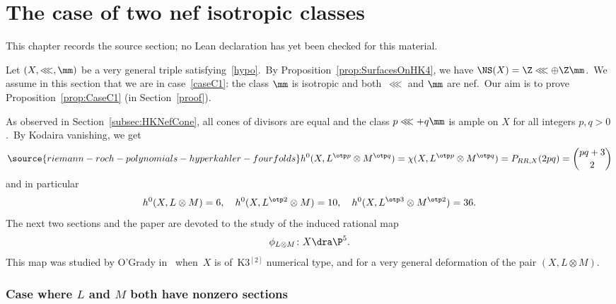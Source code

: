 \chapter{The case of two nef isotropic classes}
\label{riemann-roch-polynomials-hyperkahler-fourfolds-chapter-06}

\begin{remark}
\label{riemann-roch-polynomials-hyperkahler-fourfolds-chapter-06-source}
This chapter records the source section; no Lean declaration has yet been checked for this material.
\notready
\end{remark}

\label{sec:TwoNefIsotropic}

Let $(X,\lll,\mm)$ be a very general triple satisfying~\eqref{hypo}.\
By Proposition~\ref{prop:SurfacesOnHK4}, we have  $\NS(X)=\Z\lll\oplus\Z\mm$.\
We assume in this section that we are in case~\ref{caseC1}: the class $\mm$ is isotropic and both~$\lll$ and $\mm$ are nef.\ Our aim is to prove Proposition~\ref{prop:CaseC1} (in Section~\ref{proof}).

As observed in Section~\ref{subsec:HKNefCone}, all cones of divisors are equal and the class $p \lll+q \mm$ is ample on $X$ for all integers $p,q>0$.\
By Kodaira vanishing, we get
\begin{equation}\label{eq:KodairaVanishingTwoNef}
\source{riemann-roch-polynomials-hyperkahler-fourfolds}
h^0(X,L^{\otp p}\otimes M^{\otp q})=\chi(X,  L^{\otp p}\otimes M^{\otp q})=P_{RR,X}(2pq) =\binom{pq+3}{2}
\end{equation}
and in particular
\[
h^0(X,L\otimes M)=6,\quad h^0(X, L^{\otp 2}\otimes M)=10,\quad h^0(X, L^{\otp 3}\otimes  M^{\otp 2})=36.
\]
The next two sections and the paper  \cite{voisinfib} are devoted to the  study of  the induced rational map
\[
\phi_{L\otimes M}\colon X\dra \P^5.
\]
This map was studied by O'Grady in~\cite[Section~4]{og1} when~$X$ is   of~K3$^{[2]}$ numerical type, and for a very general deformation of the pair $(X,L\otimes M)$.\


\subsection{Case where $L$ and $M$ both have nonzero sections}\label{nonz}

